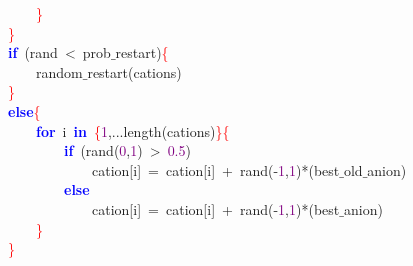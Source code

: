 \mbox{}\ \ \ \ \ \ \ \ \textcolor{Red}{\}} \\
\mbox{}\ \ \ \ \textcolor{Red}{\}} \\
\mbox{}\ \ \ \ \textbf{\textcolor{Blue}{if}}\ \textcolor{BrickRed}{(}rand\ \textcolor{BrickRed}{\textless{}}\ prob$\_$restart\textcolor{BrickRed}{)}\textcolor{Red}{\{} \\
\mbox{}\ \ \ \ \ \ \ \ random$\_$restart\textcolor{BrickRed}{(}cations\textcolor{BrickRed}{)} \\
\mbox{}\ \ \ \ \textcolor{Red}{\}} \\
\mbox{}\ \ \ \ \textbf{\textcolor{Blue}{else}}\textcolor{Red}{\{} \\
\mbox{}\ \ \ \ \ \ \ \ \textbf{\textcolor{Blue}{for}}\ i\ \textbf{\textcolor{Blue}{in}}\ \textcolor{Red}{\{}\textcolor{Purple}{1}\textcolor{BrickRed}{,...}length\textcolor{BrickRed}{(}cations\textcolor{BrickRed}{)}\textcolor{Red}{\}\{} \\
\mbox{}\ \ \ \ \ \ \ \ \ \ \ \ \textbf{\textcolor{Blue}{if}}\ \textcolor{BrickRed}{(}rand\textcolor{BrickRed}{(}\textcolor{Purple}{0}\textcolor{BrickRed}{,}\textcolor{Purple}{1}\textcolor{BrickRed}{)}\ \textcolor{BrickRed}{\textgreater{}}\ \textcolor{Purple}{0.5}\textcolor{BrickRed}{)} \\
\mbox{}\ \ \ \ \ \ \ \ \ \ \ \ \ \ \ \ cation\textcolor{BrickRed}{[}i\textcolor{BrickRed}{]}\ \textcolor{BrickRed}{=}\ cation\textcolor{BrickRed}{[}i\textcolor{BrickRed}{]}\ \textcolor{BrickRed}{+}\ rand\textcolor{BrickRed}{(-}\textcolor{Purple}{1}\textcolor{BrickRed}{,}\textcolor{Purple}{1}\textcolor{BrickRed}{)*(}best$\_$old$\_$anion\textcolor{BrickRed}{)} \\
\mbox{}\ \ \ \ \ \ \ \ \ \ \ \ \textbf{\textcolor{Blue}{else}} \\
\mbox{}\ \ \ \ \ \ \ \ \ \ \ \ \ \ \ \ cation\textcolor{BrickRed}{[}i\textcolor{BrickRed}{]}\ \textcolor{BrickRed}{=}\ cation\textcolor{BrickRed}{[}i\textcolor{BrickRed}{]}\ \textcolor{BrickRed}{+}\ rand\textcolor{BrickRed}{(-}\textcolor{Purple}{1}\textcolor{BrickRed}{,}\textcolor{Purple}{1}\textcolor{BrickRed}{)*(}best$\_$anion\textcolor{BrickRed}{)} \\
\mbox{}\ \ \ \ \ \ \ \ \textcolor{Red}{\}} \\
\mbox{}\ \ \ \ \textcolor{Red}{\}} \\
\mbox{}
